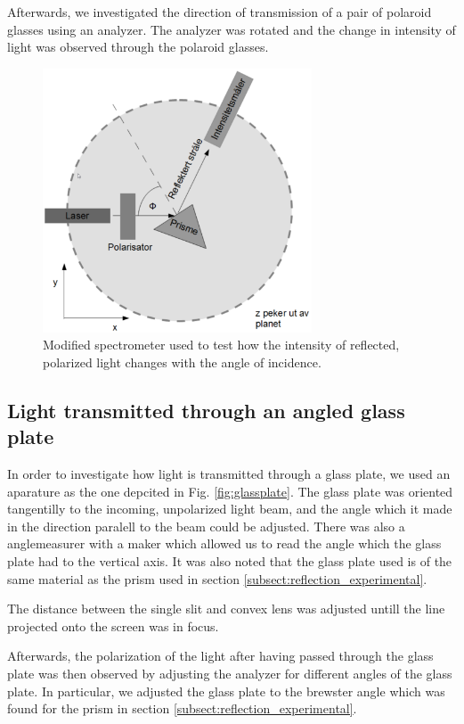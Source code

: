 \documentclass[11pt,a4paper, twocolumn]{article}
\begin{document}
      Afterwards, we investigated the direction of transmission of a pair of polaroid glasses using an analyzer. The analyzer was rotated and the change in intensity of light was observed through the polaroid glasses.

    \begin{figure}[H]
      \center
      \includegraphics[width=8cm]{scripts/figs/modified_spectrometer.png}
      \caption{Modified spectrometer used to test how the intensity of reflected, polarized light changes with the angle of incidence.}
      \label{fig:mod_spectro}
    \end{figure}

  \subsection{Light transmitted through an angled glass plate}

    In order to investigate how light is transmitted through a glass plate, we used an aparature as the one depcited in Fig. \ref{fig:glassplate}. The glass plate was oriented tangentilly to the incoming, unpolarized light beam, and the angle which it made in the direction paralell to the beam could be adjusted. There was also a anglemeasurer with a maker which allowed us to read the angle which the glass plate had to the vertical axis. It was also noted that the glass plate used is of the same material as the prism used in section \ref{subsect:reflection_experimental}.

    The distance between the single slit and convex lens was adjusted untill the line projected onto the screen was in focus.

    Afterwards, the polarization of the light after having passed through the glass plate was then observed by adjusting the analyzer for different angles of the glass plate. In particular, we adjusted the glass plate to the brewster angle which was found for the prism in section \ref{subsect:reflection_experimental}.
\end{document}
